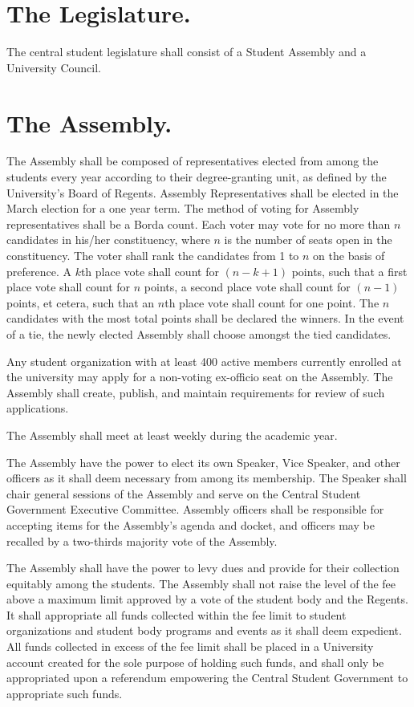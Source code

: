 \section{The Legislature.}
    The central student legislature shall consist of a Student Assembly and a University Council.

\section{The Assembly.}
    The Assembly shall be composed of representatives elected from among the students every year according to their degree-granting unit, as defined by the University's Board of Regents. Assembly Representatives shall be elected in the March election for a one year term.  The method of voting for Assembly representatives shall be a Borda count. Each voter may vote for no more than $n$ candidates in his/her constituency, where $n$ is the number of seats open in the constituency. The voter shall rank the candidates from 1 to $n$ on the basis of preference.  A $k$th place vote shall count for $(n - k + 1)$ points, such that a first place vote shall count for $n$ points, a second place vote shall count for $(n - 1)$ points, et cetera, such that an $n$th place vote shall count for one point.  The $n$ candidates with the most total points shall be declared the winners.  In the event of a tie, the newly elected Assembly shall choose amongst the tied candidates.

    Any student organization with at least 400 active members currently enrolled at the university may apply for a non-voting ex-officio seat on the Assembly. The Assembly shall create, publish, and maintain requirements for review of such applications.

    The Assembly shall meet at least weekly during the academic year.

    The Assembly have the power to elect its own Speaker, Vice Speaker, and other officers as it shall deem necessary from among its membership. The Speaker shall chair general sessions of the Assembly and serve on the Central Student Government Executive Committee. Assembly officers shall be responsible for accepting items for the Assembly's agenda and docket, and officers may be recalled by a two-thirds majority vote of the Assembly.

     The Assembly shall have the power to levy dues and provide for their collection equitably among the students. The Assembly shall not raise the level of the fee above a maximum limit approved by a vote of the student body and the Regents. It shall appropriate all funds collected within the fee limit to student organizations and student body programs and events as it shall deem expedient. All funds collected in excess of the fee limit shall be placed in a University account created for the sole purpose of holding such funds, and shall only be appropriated upon a referendum empowering the Central Student Government to appropriate such funds. 

